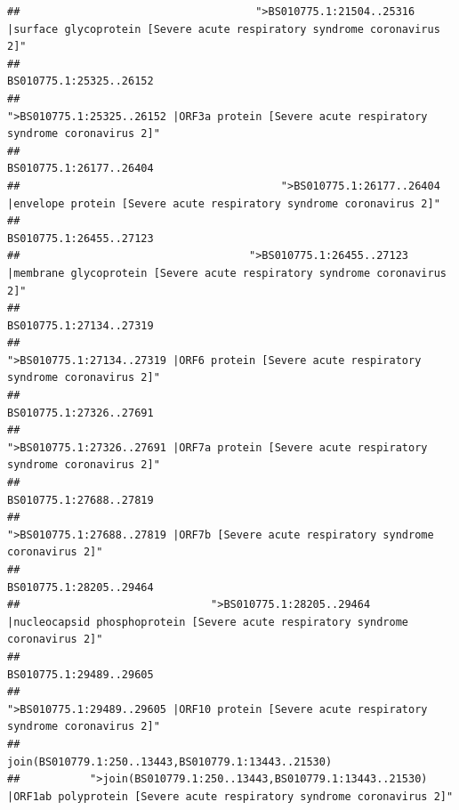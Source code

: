 \documentclass[
]{article}
\begin{document}
\begin{verbatim}
##                                     ">BS010775.1:21504..25316 |surface glycoprotein [Severe acute respiratory syndrome coronavirus 2]" 
##                                                                                                                BS010775.1:25325..26152 
##                                            ">BS010775.1:25325..26152 |ORF3a protein [Severe acute respiratory syndrome coronavirus 2]" 
##                                                                                                                BS010775.1:26177..26404 
##                                         ">BS010775.1:26177..26404 |envelope protein [Severe acute respiratory syndrome coronavirus 2]" 
##                                                                                                                BS010775.1:26455..27123 
##                                    ">BS010775.1:26455..27123 |membrane glycoprotein [Severe acute respiratory syndrome coronavirus 2]" 
##                                                                                                                BS010775.1:27134..27319 
##                                             ">BS010775.1:27134..27319 |ORF6 protein [Severe acute respiratory syndrome coronavirus 2]" 
##                                                                                                                BS010775.1:27326..27691 
##                                            ">BS010775.1:27326..27691 |ORF7a protein [Severe acute respiratory syndrome coronavirus 2]" 
##                                                                                                                BS010775.1:27688..27819 
##                                                    ">BS010775.1:27688..27819 |ORF7b [Severe acute respiratory syndrome coronavirus 2]" 
##                                                                                                                BS010775.1:28205..29464 
##                              ">BS010775.1:28205..29464 |nucleocapsid phosphoprotein [Severe acute respiratory syndrome coronavirus 2]" 
##                                                                                                                BS010775.1:29489..29605 
##                                            ">BS010775.1:29489..29605 |ORF10 protein [Severe acute respiratory syndrome coronavirus 2]" 
##                                                                                    join(BS010779.1:250..13443,BS010779.1:13443..21530) 
##           ">join(BS010779.1:250..13443,BS010779.1:13443..21530) |ORF1ab polyprotein [Severe acute respiratory syndrome coronavirus 2]" 

\end{verbatim}
\end{document}
